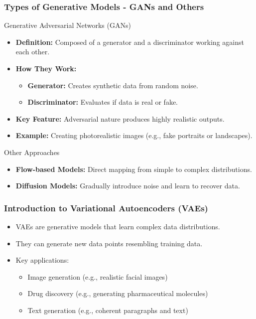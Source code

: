 \documentclass[aspectratio=169]{beamer}
\begin{document}
\begin{frame}[fragile]
    \frametitle{Types of Generative Models - GANs and Others}
    \begin{block}{Generative Adversarial Networks (GANs)}
        \begin{itemize}
            \item \textbf{Definition:} Composed of a generator and a discriminator working against each other.
            \item \textbf{How They Work:}
            \begin{itemize}
                \item \textbf{Generator:} Creates synthetic data from random noise.
                \item \textbf{Discriminator:} Evaluates if data is real or fake.
            \end{itemize}
            \item \textbf{Key Feature:} Adversarial nature produces highly realistic outputs.
            \item \textbf{Example:} Creating photorealistic images (e.g., fake portraits or landscapes).
        \end{itemize}
    \end{block}
    
    \begin{block}{Other Approaches}
        \begin{itemize}
            \item \textbf{Flow-based Models:} Direct mapping from simple to complex distributions.
            \item \textbf{Diffusion Models:} Gradually introduce noise and learn to recover data.
        \end{itemize}
    \end{block}
\end{frame}

\begin{frame}[fragile]
    \frametitle{Introduction to Variational Autoencoders (VAEs)}
    \begin{itemize}
        \item VAEs are generative models that learn complex data distributions.
        \item They can generate new data points resembling training data.
        \item Key applications:
        \begin{itemize}
            \item Image generation (e.g., realistic facial images)
            \item Drug discovery (e.g., generating pharmaceutical molecules)
            \item Text generation (e.g., coherent paragraphs and text)
        \end{itemize}
    \end{itemize}
\end{frame}
\end{document}

